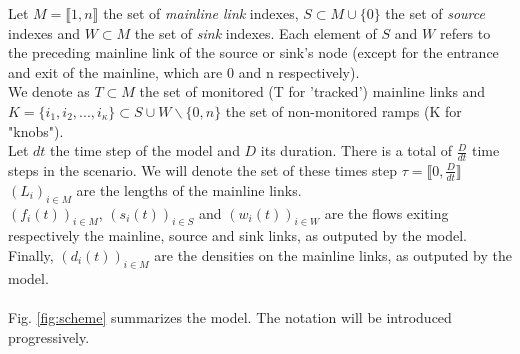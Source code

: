 Let $M=\llbracket 1,n \rrbracket$ the set of \emph{mainline link} indexes, $S\subset{M\cup\{0\}}$ the set of \emph{source} indexes and $W\subset{M}$ the set of \emph{sink} indexes. Each element of $S$ and $W$ refers to the preceding mainline link of the source or sink's node (except for the entrance and exit of the mainline, which are 0 and n respectively). \\
We denote as $T\subset{M}$ the set of monitored (T for 'tracked') mainline links and $K=\{ i_{1},i_{2},...,i_{\kappa}\}\subset{S\cup W\backslash \{0,n\}}$ the set of non-monitored ramps (K for "knobs").\\
Let $dt$ the time step of the model and $D$ its duration. There is a total of $\frac{D}{dt}$ time steps in the scenario. We will denote the set of these times step $\tau=\llbracket 0,\frac{D}{dt}\rrbracket $\\
$(L_{i})_{i\in M}$ are the lengths of the mainline links.\\
$(f_{i}(t))_{i\in{M}}$, $(s_{i}(t))_{i\in{S}}$ and $(w_{i}(t))_{i\in{W}}$ are the flows exiting respectively the mainline, source and sink links, as outputed by the model.\\
Finally, $(d_{i}(t))_{i\in{M}}$ are the densities on the mainline links, as outputed by the model.\\
\\

Fig.	 \ref{fig:scheme} summarizes the model. The notation will be introduced progressively. \\


